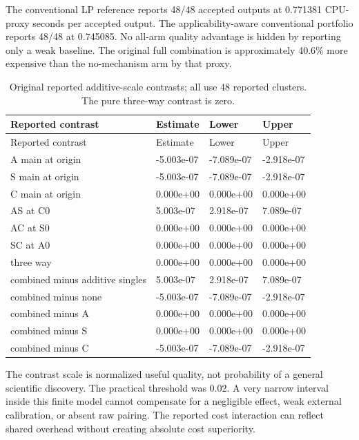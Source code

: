 The conventional LP reference reports 48/48 accepted outputs at 0.771381
CPU-proxy seconds per accepted output. The applicability-aware
conventional portfolio reports 48/48 at 0.745085. No all-arm quality
advantage is hidden by reporting only a weak baseline. The original full
combination is approximately 40.6\% more expensive than the no-mechanism
arm by that proxy.

\begin{longtable}[]{@{}llll@{}}
\caption{Original reported additive-scale contrasts; all use 48 reported
clusters. The pure three-way contrast is zero.}\tabularnewline
\toprule\noalign{}
Reported contrast & Estimate & Lower & Upper \\
\midrule\noalign{}
\endfirsthead
\toprule\noalign{}
Reported contrast & Estimate & Lower & Upper \\
\midrule\noalign{}
\endhead
\bottomrule\noalign{}
\endlastfoot
A main at origin & -5.003e-07 & -7.089e-07 & -2.918e-07 \\
S main at origin & -5.003e-07 & -7.089e-07 & -2.918e-07 \\
C main at origin & 0.000e+00 & 0.000e+00 & 0.000e+00 \\
AS at C0 & 5.003e-07 & 2.918e-07 & 7.089e-07 \\
AC at S0 & 0.000e+00 & 0.000e+00 & 0.000e+00 \\
SC at A0 & 0.000e+00 & 0.000e+00 & 0.000e+00 \\
three way & 0.000e+00 & 0.000e+00 & 0.000e+00 \\
combined minus additive singles & 5.003e-07 & 2.918e-07 & 7.089e-07 \\
combined minus none & -5.003e-07 & -7.089e-07 & -2.918e-07 \\
combined minus A & 0.000e+00 & 0.000e+00 & 0.000e+00 \\
combined minus S & 0.000e+00 & 0.000e+00 & 0.000e+00 \\
combined minus C & -5.003e-07 & -7.089e-07 & -2.918e-07 \\
\end{longtable}

The contrast scale is normalized useful quality, not probability of a
general scientific discovery. The practical threshold was 0.02. A very
narrow interval inside this finite model cannot compensate for a
negligible effect, weak external calibration, or absent raw pairing. The
reported cost interaction can reflect shared overhead without creating
absolute cost superiority.

